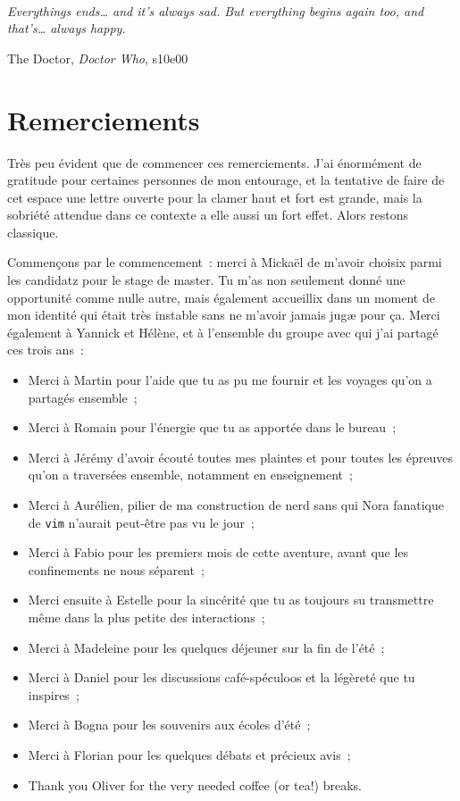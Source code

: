 \documentclass[../main/main.tex]{subfiles}
\begin{document}
\thispagestyle{empty}
~
\clearpage
\thispagestyle{empty}
\vspace*{\fill}
\epigraph{\openquote\textit{Everythings ends… and it's always sad. But
        everything begins again too, and that's… always happy.
\closequote}}{The Doctor, \textit{Doctor Who}, s10e00}
\vspace*{\fill}

\chapter*{Remerciements}

Très peu évident que de commencer ces remerciements. J'ai énormément de
gratitude pour certaines personnes de mon entourage, et la tentative de faire de
cet espace une lettre ouverte pour la clamer haut et fort est grande, mais la
sobriété attendue dans ce contexte a elle aussi un fort effet. Alors restons
classique.

Commençons par le commencement~: merci à Mickaël de m'avoir choisix parmi les
candidatz pour le stage de master. Tu m'as non seulement donné une opportunité
comme nulle autre, mais également accueillix dans un moment de mon identité qui
était très instable sans ne m'avoir jamais jugæ pour ça. Merci également à
Yannick et Hélène, et à l'ensemble du groupe avec qui j'ai partagé ces trois
ans~:
\begin{itemize}
    \item Merci à Martin pour l'aide que tu as pu me fournir et les voyages
        qu'on a partagés ensemble~;
    \item Merci à Romain pour l'énergie que tu as apportée dans le bureau~;
    \item Merci à Jérémy d'avoir écouté toutes mes plaintes et pour toutes les
        épreuves qu'on a traversées ensemble, notamment en enseignement~;
    \item Merci à Aurélien, pilier de ma construction de nerd sans qui Nora
        fanatique de \texttt{vim} n'aurait peut-être pas vu le jour~;
    \item Merci à Fabio pour les premiers mois de cette aventure, avant que les
        confinements ne nous séparent~;
    \item Merci ensuite à Estelle pour la sincérité que tu as toujours su
        transmettre même dans la plus petite des interactions~;
    \item Merci à Madeleine pour les quelques déjeuner sur la fin de l'été~;
    \item Merci à Daniel pour les discussions café-spéculoos et la légèreté que
        tu inspires~;
    \item Merci à Bogna pour les souvenirs aux écoles d'été~;
    \item Merci à Florian pour les quelques débats et précieux avis~;
    \item Thank you Oliver for the very needed coffee (or tea!) breaks.
\end{itemize}
\end{document}
